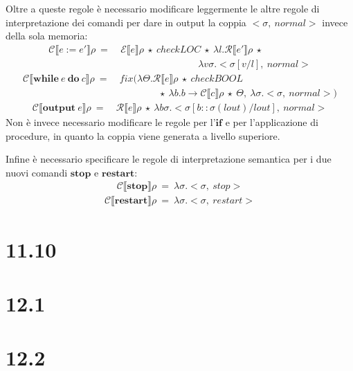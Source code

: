 \documentclass[a4paper,twosides]{report}
\begin{document}
Oltre a queste regole \`e necessario modificare leggermente le altre regole
di interpretazione dei comandi per dare in output la coppia $<\sigma,\
normal>$ invece della sola memoria:
\begin{align*}
  \mathcal{C}\llbracket e:=e'\rrbracket\rho\ =\ &\mathcal{E}\llbracket
  e\rrbracket\rho\ \star\ checkLOC\ \star\ \lambda
  l.\mathcal{R}\llbracket e'\rrbracket\rho\ \star\\
  &\qquad\qquad\qquad\qquad\lambda
  v\sigma.<\sigma[v/l],\ normal>
\end{align*}
\begin{align*}
  \mathcal{C}\llbracket\mathbf{while}\ e\ \mathbf{do}\ c\rrbracket\rho\
  =\ &fix(\lambda\Theta.\mathcal{R}\llbracket e\rrbracket\rho\ \star\
  checkBOOL\\
  &\qquad\qquad\star\ \lambda b.b\rightarrow\mathcal{C}\llbracket
  c\rrbracket\rho\ \star\ \Theta,\ \lambda\sigma.<\sigma,\ normal>)
\end{align*}
\begin{align*}
  \mathcal{C}\llbracket\mathbf{output}\ e\rrbracket\rho\ =\ 
  &\mathcal{R}\llbracket e\rrbracket\rho\ \star\ \lambda
  b\sigma.<\sigma[b::\sigma(lout)/lout],\ normal>
\end{align*}
Non \`e invece necessario modificare le regole per l'$\mathbf{if}$ e
per l'applicazione di procedure, in quanto la coppia viene generata a
livello superiore.

Infine \`e necessario specificare le regole di interpretazione
semantica per i due nuovi comandi $\mathbf{stop}$ e
$\mathbf{restart}$:
\begin{align*}
  \mathcal{C}\llbracket\mathbf{stop}\rrbracket\rho\ =\
  \lambda\sigma.<\sigma,\ stop>
\end{align*}
\begin{align*}
  \mathcal{C}\llbracket\mathbf{restart}\rrbracket\rho\ =\
  \lambda\sigma.<\sigma,\ restart>
\end{align*}

\section*{11.10}

\section*{12.1}

\section*{12.2}
 
\end{document}
